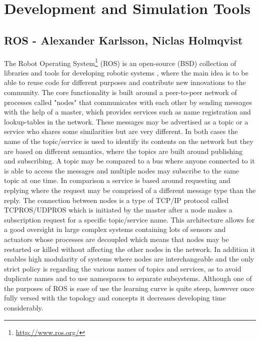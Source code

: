 \section{Development and Simulation Tools}
\subsection{ROS - Alexander Karlsson, Niclas Holmqvist}
The Robot Operating System\footnote{\url{http://www.ros.org/}} (ROS) is an open-source (BSD) collection of libraries and tools for developing robotic systems \cite{quigley2009ros}, where the main idea is to be able to reuse code for different purposes and contribute new innovations to the community. The core functionality is built around a peer-to-peer network of processes called "nodes" that communicates with each other by sending messages with the help of a master, which provides services such as name registration and lookup-tables in the network. These messages may be advertised as a topic or a service who shares some similarities but are very different. In both cases the name of the topic/service is used to identify its contents on the network but they are based on different semantics, where the topics are built around publishing and subscribing. A topic may be compared to a bus where anyone connected to it is able to access the messages and multiple nodes may subscribe to the same topic at one time. In comparison a service is based around requesting and replying where the request may be comprised of a different message type than the reply. The connection between nodes is a type of TCP/IP protocol called TCPROS/UDPROS which is initiated by the master after a node makes a subscription request for a specific topic/service name. This architecture allows for a good oversight in large complex systems containing lots of sensors and actuators whose processes are decoupled which means that nodes may be restarted or killed without affecting the other nodes in the network. In addition it enables high modularity of systems where nodes are interchangeable and the only strict policy is regarding the various names of topics and services, as to avoid duplicate names and to use namespaces to separate subsystems. Although one of the purposes of ROS is ease of use the learning curve is quite steep, however once fully versed with the topology and concepts it decreases developing time considerably.


